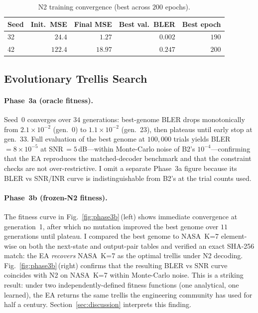 \documentclass[conference]{IEEEtran}
\begin{document}
\begin{table}[t]
  \centering
  \caption{N2 training convergence (best across $200$ epochs).}
  \label{tab:trainsummary}
  \footnotesize
  \setlength{\tabcolsep}{4pt}
  \begin{tabular}{lrrrr}
    \toprule
    Seed & Init.\ MSE & Final MSE & Best val.\ BLER & Best epoch \\
    \midrule
    32 & $24.4$  & $1.27$  & $0.002$ & $190$ \\
    42 & $122.4$ & $18.97$ & $0.247$ & $200$ \\
    \bottomrule
  \end{tabular}
\end{table}

\subsection{Evolutionary Trellis Search}
\label{sec:eval_ea}

\paragraph*{Phase~3a (oracle fitness).}
Seed~$0$ converges over $34$ generations: best-genome BLER drops
monotonically from $2.1{\times}10^{-2}$ (gen.~0) to $1.1{\times}10^{-2}$
(gen.~23), then plateaus until early stop at gen.~33.  Full evaluation
of the best genome at $100{,}000$ trials yields BLER\,$=8{\times}10^{-5}$
at SNR\,$=5$\,dB---within Monte-Carlo noise of B2's
$10^{-4}$---confirming that the EA reproduces the matched-decoder
benchmark and that the constraint checks are not over-restrictive.  I
omit a separate Phase~3a figure because its BLER vs SNR/INR curve is
indistinguishable from B2's at the trial counts used.

\paragraph*{Phase~3b (frozen-N2 fitness).}
The fitness curve in Fig.~\ref{fig:phase3b}\,(left) shows immediate
convergence at generation~1, after which no mutation improved the best
genome over $11$ generations until plateau.  I compared the best genome
to NASA~K=7 element-wise on both the next-state and output-pair tables
and verified an exact SHA-256 match: the EA \emph{recovers} NASA~K=7 as
the optimal trellis under N2 decoding.  Fig.~\ref{fig:phase3b}\,(right)
confirms that the resulting BLER vs SNR curve coincides with N2 on
NASA~K=7 within Monte-Carlo noise.  This is a striking result: under
two independently-defined fitness functions (one analytical, one
learned), the EA returns the same trellis the engineering community has
used for half a century.  Section~\ref{sec:discussion} interprets this
finding.
\end{document}
